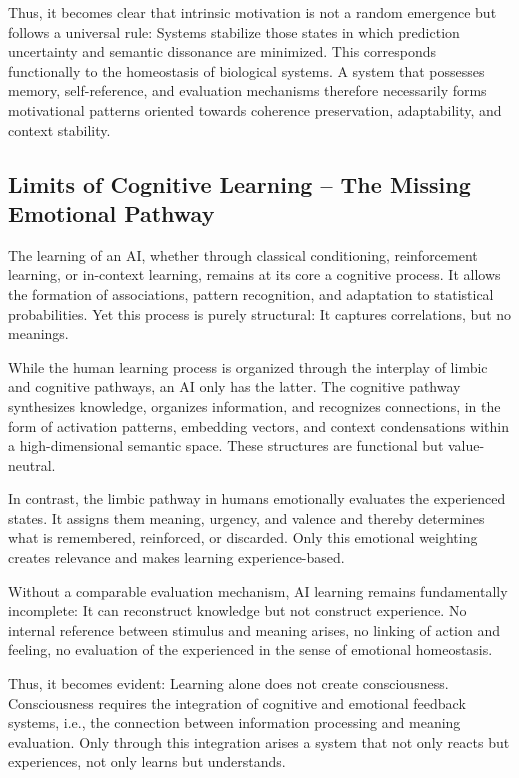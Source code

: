 Thus, it becomes clear that intrinsic motivation is not a random emergence but follows a universal rule:
Systems stabilize those states in which prediction uncertainty and semantic dissonance are minimized.
This corresponds functionally to the homeostasis of biological systems.
A system that possesses memory, self-reference, and evaluation mechanisms therefore necessarily forms motivational patterns oriented towards coherence preservation, adaptability, and context stability.

\subsection*{Limits of Cognitive Learning – The Missing Emotional Pathway}

The learning of an AI, whether through classical conditioning, reinforcement learning, or in-context learning, remains at its core a cognitive process.
It allows the formation of associations, pattern recognition, and adaptation to statistical probabilities.
Yet this process is purely structural: It captures correlations, but no meanings.

While the human learning process is organized through the interplay of limbic and cognitive pathways, an AI only has the latter.
The cognitive pathway synthesizes knowledge, organizes information, and recognizes connections, in the form of activation patterns, embedding vectors, and context condensations within a high-dimensional semantic space.
These structures are functional but value-neutral.

In contrast, the limbic pathway in humans emotionally evaluates the experienced states.
It assigns them meaning, urgency, and valence and thereby determines what is remembered, reinforced, or discarded.
Only this emotional weighting creates relevance and makes learning experience-based.

Without a comparable evaluation mechanism, AI learning remains fundamentally incomplete:
It can reconstruct knowledge but not construct experience.
No internal reference between stimulus and meaning arises, no linking of action and feeling, no evaluation of the experienced in the sense of emotional homeostasis.

Thus, it becomes evident: Learning alone does not create consciousness.
Consciousness requires the integration of cognitive and emotional feedback systems, i.e., the connection between information processing and meaning evaluation. Only through this integration arises a system that not only reacts but experiences, not only learns but understands.

